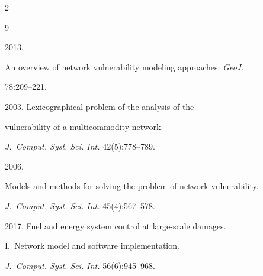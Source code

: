   \begin{multicols}{2}





\renewcommand{\bibname}{\protect\rmfamily References}







{\small\frenchspacing


 {%




 \begin{thebibliography}{9}




 2013.  


An overview of network vulnerability modeling approaches. \textit{GeoJ.}


78:209--221.


 




 2003. Lexicographical problem of the analysis of the 


vulnerability of a multicommodity network.


\textit{J.~Comput. Syst. Sci. Int.} 42(5):778--789.   







 2006. 


Models and methods for solving the problem of network vulnerability. 


\textit{J.~Comput. Syst. Sci. Int.} 45(4):567--578.









2017. Fuel and energy system control at large-scale damages. 


I.~Network model and software implementation.  


\textit{J.~Comput. Syst. Sci. Int.} 56(6):945--968. 








\end{thebibliography}}}
\end{multicols}
